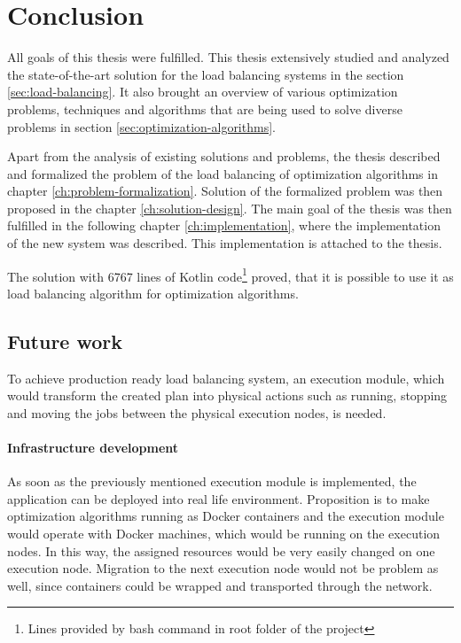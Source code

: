 \chapter{Conclusion}\label{ch:conclusion}
All goals of this thesis were fulfilled.
This thesis extensively studied 
and analyzed the state-of-the-art solution for the load balancing systems in the section \ref{sec:load-balancing}. 
It also brought an overview of various optimization problems, techniques and algorithms 
that are being used to solve diverse problems in section \ref{sec:optimization-algorithms}.

Apart from the analysis of existing solutions and problems,
the thesis described and formalized the problem of the load balancing of optimization algorithms in chapter \ref{ch:problem-formalization}.
Solution of the formalized problem was then proposed in the chapter \ref{ch:solution-design}.
The main goal of the thesis was then fulfilled in the following chapter \ref{ch:implementation},
where the implementation of the new system was described.
This implementation is attached to the thesis.

The solution with 6767 lines of Kotlin 
code\footnote{Lines provided by  bash command in root folder of the project} 
proved, that it is possible to use it as load balancing algorithm for optimization algorithms.

\section{Future work}\label{sec:future-work}
To achieve production ready load balancing system, 
an execution module, 
which would transform the created plan into physical actions 
such as running, stopping and moving the jobs between the physical execution nodes,
is needed.

\subsubsection{Infrastructure development}
As soon as the previously mentioned execution module is implemented,
the application can be deployed into real life environment.
Proposition is to make optimization algorithms running as Docker containers 
and the execution module would operate with Docker machines,
which would be running on the execution nodes. 
In this way, 
the assigned resources would be very easily changed on one execution node.
Migration to the next execution node would not be problem as well, 
since containers could be wrapped and transported through the network.


